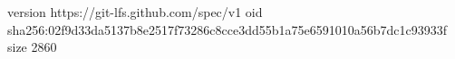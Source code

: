 version https://git-lfs.github.com/spec/v1
oid sha256:02f9d33da5137b8e2517f73286c8cce3dd55b1a75e6591010a56b7dc1c93933f
size 2860
